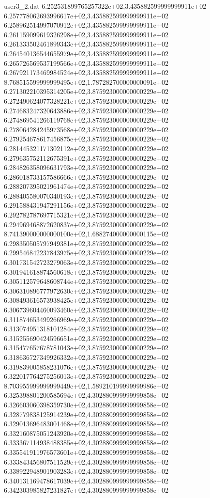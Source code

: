 \begin{filecontents}{user3_2.dat}
6.252531899765257322e+02,3.435882599999999911e+02
6.257778062693996617e+02,3.435882599999999911e+02
6.258962514997070912e+02,3.435882599999999911e+02
6.261159099619326298e+02,3.435882599999999911e+02
6.261333502461899343e+02,3.435882599999999911e+02
6.264540136544655979e+02,3.435882599999999911e+02
6.265726569537199566e+02,3.435882599999999911e+02
6.267921173469984524e+02,3.435882599999999911e+02
8.768515599999999495e+02,1.787282700000000091e+02
6.271302210395314205e+02,3.875923000000000229e+02
6.272490624077328221e+02,3.875923000000000229e+02
6.274683247320643886e+02,3.875923000000000229e+02
6.274869541266119768e+02,3.875923000000000229e+02
6.278064284245973568e+02,3.875923000000000229e+02
6.279254678617456875e+02,3.875923000000000229e+02
6.281445321171302112e+02,3.875923000000000229e+02
6.279635752112675391e+02,3.875923000000000229e+02
6.284826358096631793e+02,3.875923000000000229e+02
6.286018733157586666e+02,3.875923000000000229e+02
6.288207395021961474e+02,3.875923000000000229e+02
6.288405580070340193e+02,3.875923000000000229e+02
6.291588431947291156e+02,3.875923000000000229e+02
6.292782787697715321e+02,3.875923000000000229e+02
6.294969468872620837e+02,3.875923000000000229e+02
8.741390000000000100e+02,1.688274000000000115e+02
6.298350505797949381e+02,3.875923000000000229e+02
6.299546842237843975e+02,3.875923000000000229e+02
6.301731542723279063e+02,3.875923000000000229e+02
6.301941618874560618e+02,3.875923000000000229e+02
6.305112579648608744e+02,3.875923000000000229e+02
6.306310896777972630e+02,3.875923000000000229e+02
6.308493616573938425e+02,3.875923000000000229e+02
6.306739604460093460e+02,3.875923000000000229e+02
6.311874653499266969e+02,3.875923000000000229e+02
6.313074951318101284e+02,3.875923000000000229e+02
6.315255690424596651e+02,3.875923000000000229e+02
6.315477657678781043e+02,3.875923000000000229e+02
6.318636727349926332e+02,3.875923000000000229e+02
6.319839005858231076e+02,3.875923000000000229e+02
6.322017764275256013e+02,3.875923000000000229e+02
8.703955999999999449e+02,1.589210199999999986e+02
6.325398801200585694e+02,4.302880999999999858e+02
6.326603060398359730e+02,4.302880999999999858e+02
6.328779838125914239e+02,4.302880999999999858e+02
6.329013696483001468e+02,4.302880999999999858e+02
6.332160875051243920e+02,4.302880999999999858e+02
6.333367114938488385e+02,4.302880999999999858e+02
6.335541911976573601e+02,4.302880999999999858e+02
6.333843456807511529e+02,4.302880999999999858e+02
6.338922948901903283e+02,4.302880999999999858e+02
6.340131169478617039e+02,4.302880999999999858e+02
6.342303985827231827e+02,4.302880999999999858e+02

\end{filecontents}
